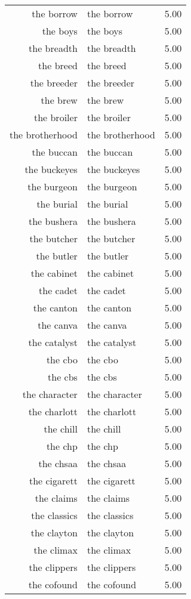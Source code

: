 \begin{table}[ht]
\begin{tabular}{rlr}
  the borrow & the borrow & 5.00 \\ 
  the boys & the boys & 5.00 \\ 
  the breadth & the breadth & 5.00 \\ 
  the breed & the breed & 5.00 \\ 
  the breeder & the breeder & 5.00 \\ 
  the brew & the brew & 5.00 \\ 
  the broiler & the broiler & 5.00 \\ 
  the brotherhood & the brotherhood & 5.00 \\ 
  the buccan & the buccan & 5.00 \\ 
  the buckeyes & the buckeyes & 5.00 \\ 
  the burgeon & the burgeon & 5.00 \\ 
  the burial & the burial & 5.00 \\ 
  the bushera & the bushera & 5.00 \\ 
  the butcher & the butcher & 5.00 \\ 
  the butler & the butler & 5.00 \\ 
  the cabinet & the cabinet & 5.00 \\ 
  the cadet & the cadet & 5.00 \\ 
  the canton & the canton & 5.00 \\ 
  the canva & the canva & 5.00 \\ 
  the catalyst & the catalyst & 5.00 \\ 
  the cbo & the cbo & 5.00 \\ 
  the cbs & the cbs & 5.00 \\ 
  the character & the character & 5.00 \\ 
  the charlott & the charlott & 5.00 \\ 
  the chill & the chill & 5.00 \\ 
  the chp & the chp & 5.00 \\ 
  the chsaa & the chsaa & 5.00 \\ 
  the cigarett & the cigarett & 5.00 \\ 
  the claims & the claims & 5.00 \\ 
  the classics & the classics & 5.00 \\ 
  the clayton & the clayton & 5.00 \\ 
  the climax & the climax & 5.00 \\ 
  the clippers & the clippers & 5.00 \\ 
  the cofound & the cofound & 5.00 \\ 

\end{tabular}
\end{table}
